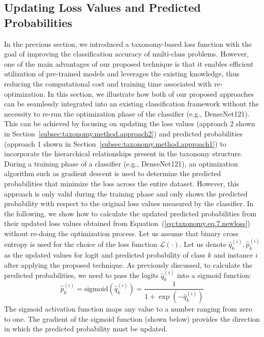 \subsection{Updating Loss Values and Predicted Probabilities}\label{subsec:updating-loss-values-and-predicted-probabilities}
In the previous section, we introduced a taxonomy-based loss function with the goal of improving the classification accuracy of multi-class problems. However, one of the main advantages of our proposed technique is that it enables efficient utilization of pre-trained models and leverages the existing knowledge, thus reducing the computational cost and training time associated with re-optimization. In this section, we illustrate how both of our proposed approaches can be seamlessly integrated into an existing classification framework without the necessity to re-run the optimization phase of the classifier (e.g., DenseNet121). This can be achieved by focusing on updating the loss values (approach 2 shown in Section~\ref{subsec:taxonomy.method.approach2}) and predicted probabilities (approach 1 shown in Section~\ref{subsec:taxonomy.method.approach1}) to incorporate the hierarchical relationships present in the taxonomy structure.
During a training phase of a classifier (e.g., DenseNet121), an optimization algorithm such as gradient descent is used to determine the predicted probabilities that minimize the loss across the entire dataset. However, this approach is only valid during the training phase and only shows the predicted probability with respect to the original loss values measured by the classifier.
In the following, we show how to calculate the updated predicted probabilities from their updated loss values obtained from Equation~(\ref{eq:taxonomy.eq.7.newloss}) without re-doing the optimization process. Let us assume that binary cross entropy is used for the choice of the loss function $\mathcal{L}(\cdot) $. Let us denote $\widehat{q}_k^{(i)}, \widehat{p}_k^{(i)} $ as the updated values for logit and predicted probability of class $k $ and instance $i $ after applying the proposed technique. As previously discussed, to calculate the predicted probabilities, we need to pass the logits ${\widehat q}_k^{(i)} $ into a sigmoid function:
\begin{equation}
    \label{eq:taxonomy.eq.9.sigmoid}
    \widehat{p}_k^{(i)}=\text{sigmoid}\left(\widehat{q}_k^{(i)}\right)=\frac1{1+\exp\left(-\widehat{q}_k^{(i)}\right)}
\end{equation}
The sigmoid activation function maps any value to a number ranging from zero to one. The gradient of the sigmoid function (shown below) provides the direction in which the predicted probability must be updated.
